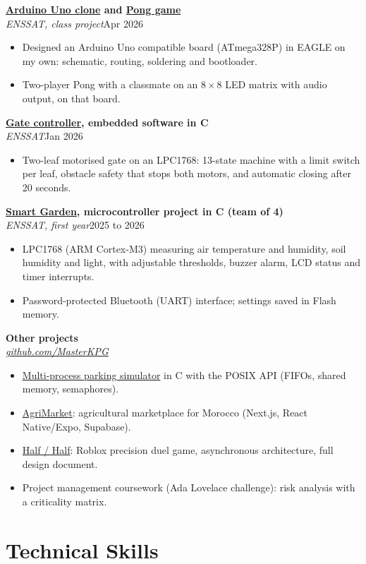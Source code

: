 \documentclass[10pt,a4paper]{article}
\newcommand{\entry}[3]{%
  \par\addvspace{6pt}%
  \noindent\textbf{#1}\\
  \textit{#2}\hfill #3\par
}
\newcommand{\project}[2]{\href{https://masterkpg.github.io/\#project-#1}{#2}}
\begin{document}
\entry{\project{arduino-clone}{Arduino Uno clone} and \project{ping-pong}{Pong game}}{ENSSAT, class project}{Apr 2026}
\begin{itemize}
  \item Designed an Arduino Uno compatible board (ATmega328P) in EAGLE on my own: schematic,
        routing, soldering and bootloader.
  \item Two-player Pong with a classmate on an $8\times8$ LED matrix with audio output, on that
        board.
\end{itemize}

\entry{\project{gate-controller}{Gate controller}, embedded software in C}{ENSSAT}{Jan 2026}
\begin{itemize}
  \item Two-leaf motorised gate on an LPC1768: 13-state machine with a limit switch per leaf,
        obstacle safety that stops both motors, and automatic closing after 20 seconds.
\end{itemize}

\entry{\project{smart-garden}{Smart Garden}, microcontroller project in C (team of 4)}{ENSSAT, first year}{2025 to 2026}
\begin{itemize}
  \item LPC1768 (ARM Cortex-M3) measuring air temperature and humidity, soil humidity and light,
        with adjustable thresholds, buzzer alarm, LCD status and timer interrupts.
  \item Password-protected Bluetooth (UART) interface; settings saved in Flash memory.
\end{itemize}

\entry{Other projects}{\href{https://github.com/MasterKPG}{github.com/MasterKPG}}{}
\begin{itemize}
  \item \project{parking-sim}{Multi-process parking simulator} in C with the POSIX API (FIFOs, shared
        memory, semaphores).
  \item \project{agrimarket}{AgriMarket}: agricultural marketplace for Morocco (Next.js, React
        Native/Expo, Supabase).
  \item \project{half-half}{Half / Half}: Roblox precision duel game, asynchronous architecture,
        full design document.
  \item Project management coursework (Ada Lovelace challenge): risk analysis with a criticality
        matrix.
\end{itemize}

\section*{Technical Skills}
\end{document}
